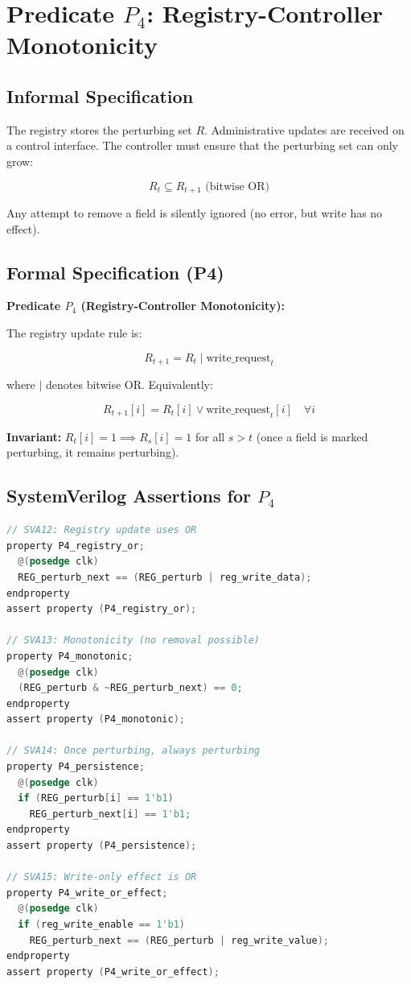 \documentclass[11pt,oneside]{article}
\begin{document}
\section{Predicate $P_4$: Registry-Controller Monotonicity}

\subsection{Informal Specification}

The registry stores the perturbing set $R$. Administrative updates are received on a control interface. The controller must ensure that the perturbing set can only grow:

\[
R_t \subseteq R_{t+1} \text{ (bitwise OR)}
\]

Any attempt to remove a field is silently ignored (no error, but write has no effect).

\subsection{Formal Specification (P4)}

\begin{boxed}
\textbf{Predicate $P_4$ (Registry-Controller Monotonicity):}

The registry update rule is:

\[
R_{t+1} = R_t \mid \text{write\_request}_t
\]

where $\mid$ denotes bitwise OR. Equivalently:

\[
R_{t+1}[i] = R_t[i] \lor \text{write\_request}_t[i] \quad \forall i
\]

\textbf{Invariant:} $R_t[i] = 1 \implies R_s[i] = 1$ for all $s > t$ (once a field is marked perturbing, it remains perturbing).
\end{boxed}

\subsection{SystemVerilog Assertions for $P_4$}

\begin{lstlisting}[language=Verilog]
// SVA12: Registry update uses OR
property P4_registry_or;
  @(posedge clk)
  REG_perturb_next == (REG_perturb | reg_write_data);
endproperty
assert property (P4_registry_or);

// SVA13: Monotonicity (no removal possible)
property P4_monotonic;
  @(posedge clk)
  (REG_perturb & ~REG_perturb_next) == 0;
endproperty
assert property (P4_monotonic);

// SVA14: Once perturbing, always perturbing
property P4_persistence;
  @(posedge clk)
  if (REG_perturb[i] == 1'b1)
    REG_perturb_next[i] == 1'b1;
endproperty
assert property (P4_persistence);

// SVA15: Write-only effect is OR
property P4_write_or_effect;
  @(posedge clk)
  if (reg_write_enable == 1'b1)
    REG_perturb_next == (REG_perturb | reg_write_value);
endproperty
assert property (P4_write_or_effect);
\end{lstlisting}
\end{document}
